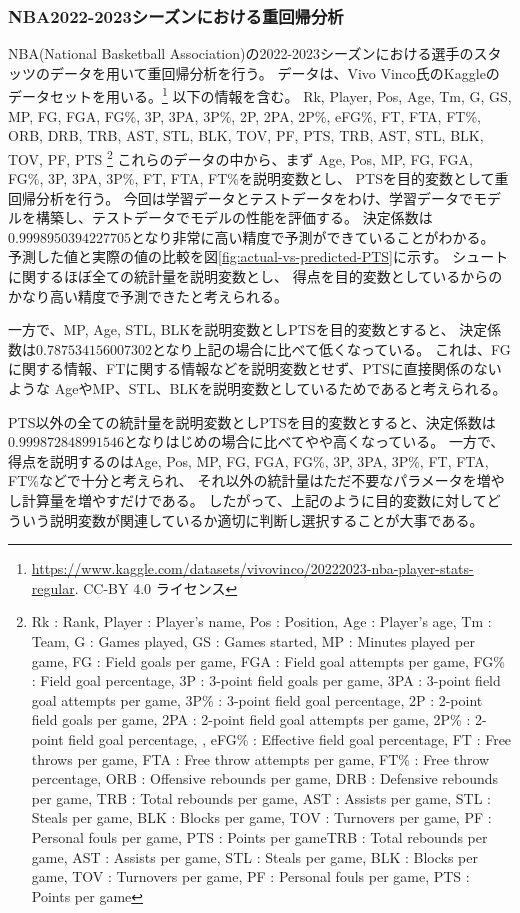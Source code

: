 \documentclass[../../../main]{subfiles}
\begin{document}
\subsubsection{NBA2022-2023シーズンにおける重回帰分析}
NBA(National Basketball Association)の2022-2023シーズンにおける選手のスタッツのデータを用いて重回帰分析を行う。
データは、Vivo Vinco氏のKaggleのデータセットを用いる。\footnote{
	\url{https://www.kaggle.com/datasets/vivovinco/20222023-nba-player-stats-regular}.
	CC-BY 4.0 ライセンス
}
以下の情報を含む。 Rk,
Player, Pos, Age, Tm, G, GS, MP, FG, FGA, FG\%, 3P, 3PA, 3P\%, 2P, 2PA, 2P\%, eFG\%, FT, FTA, FT\%, ORB, DRB, TRB, AST, STL, BLK, TOV, PF, PTS, TRB, AST, STL, BLK, TOV, PF, PTS
\footnote{
	Rk : Rank,
	Player : Player's name,
	Pos : Position,
	Age : Player's age,
	Tm : Team,
	G : Games played,
	GS : Games started,
	MP : Minutes played per game,
	FG : Field goals per game,
	FGA : Field goal attempts per game,
	FG\% : Field goal percentage,
	3P : 3-point field goals per game,
	3PA : 3-point field goal attempts per game,
	3P\% : 3-point field goal percentage,
	2P : 2-point field goals per game,
	2PA : 2-point field goal attempts per game,
	2P\% : 2-point field goal percentage, ,
	eFG\% : Effective field goal percentage,
	FT : Free throws per game,
	FTA : Free throw attempts per game,
	FT\% : Free throw percentage,
	ORB : Offensive rebounds per game,
	DRB : Defensive rebounds per game,
	TRB : Total rebounds per game,
	AST : Assists per game,
	STL : Steals per game,
	BLK : Blocks per game,
	TOV : Turnovers per game,
	PF : Personal fouls per game,
	PTS : Points per gameTRB : Total rebounds per game,
	AST : Assists per game,
	STL : Steals per game,
	BLK : Blocks per game,
	TOV : Turnovers per game,
	PF : Personal fouls per game,
	PTS : Points per game
}
これらのデータの中から、まず
Age, Pos, MP, FG, FGA, FG\%, 3P, 3PA, 3P\%, FT, FTA, FT\%を説明変数とし、
PTSを目的変数として重回帰分析を行う。
今回は学習データとテストデータをわけ、学習データでモデルを構築し、テストデータでモデルの性能を評価する。
決定係数は$0.9998950394227705$となり非常に高い精度で予測ができていることがわかる。
予測した値と実際の値の比較を図\ref{fig:actual-vs-predicted-PTS}に示す。
シュートに関するほぼ全ての統計量を説明変数とし、
得点を目的変数としているからのかなり高い精度で予測できたと考えられる。


一方で、MP, Age, STL, BLKを説明変数としPTSを目的変数とすると、
決定係数は$0.787534156007302$となり上記の場合に比べて低くなっている。
これは、FGに関する情報、FTに関する情報などを説明変数とせず、PTSに直接関係のないような
AgeやMP、STL、BLKを説明変数としているためであると考えられる。


PTS以外の全ての統計量を説明変数としPTSを目的変数とすると、決定係数は$0.999872848991546$となりはじめの場合に比べてやや高くなっている。
一方で、得点を説明するのはAge, Pos, MP, FG, FGA, FG\%, 3P, 3PA, 3P\%, FT, FTA, FT\%などで十分と考えられ、
それ以外の統計量はただ不要なパラメータを増やし計算量を増やすだけである。
したがって、上記のように目的変数に対してどういう説明変数が関連しているか適切に判断し選択することが大事である。
\end{document}
